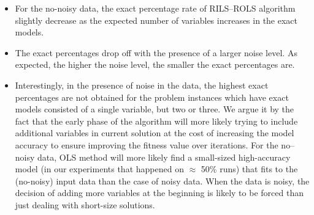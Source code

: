 \documentclass[a4paper,12pt]{elsarticle}
\begin{document}
\begin{itemize}
	\item For the no-noisy data, the exact percentage rate of \textsc{RILS}--\textsc{ROLS} algorithm  slightly decrease as the expected number of variables increases in the exact models. 
	\item The exact percentages drop off with the presence of a larger noise level. As expected, the higher the noise level, the smaller the exact percentages are.
	\item Interestingly, in the presence of noise in the data, the highest exact percentages are not obtained for the problem instances which have exact models consisted of a single variable, but two or three. We argue it by the fact that the early phase of the algorithm will more likely trying to include additional variables in current solution at the cost of increasing the model accuracy to ensure improving the fitness value over iterations. For the no--noisy data, OLS method will more likely find a small-sized high-accuracy model (in our experiments that happened on $\approx$ 50\% runs) that fits to the (no-noisy) input data than the case of noisy data. When the data is noisy, the decision of adding more variables at the beginning is likely to be forced than just dealing with short-size solutions. %
\end{itemize}
\end{document}
